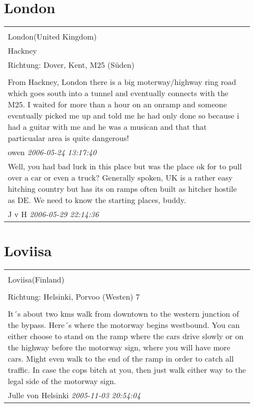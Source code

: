 \documentclass[a4paper,12pt]{article}
\begin{document}
\section{London}
\begin{tabular}{|p{13cm}|}
\hline\\
London(United Kingdom)\\
Hackney\\
Richtung: Dover, Kent, M25 (Süden) \\
\hline\\
From Hackney, London there is a big moterway/highway ring road which goes south into a tunnel and eventually connects with the M25. I waited for more than a hour on an onramp and someone eventually picked me up and told me he had only done so because i had a guitar with me and he was a musican and that that particualar area is quite dangerous! \\
owen \textit{ 2006-05-24 13:17:40 }\\\hline Well, you had bad luck in this place but was the place ok for to pull over a car or even a truck? Generally spoken, UK is a rather easy hitching country but has its on ramps often built as hitcher hostile as DE. We need to know the starting places, buddy. \\
J v H \textit{ 2006-05-29 22:14:36 }\\\hline
\end{tabular}


\section{Loviisa}
\begin{tabular}{|p{13cm}|}
\hline\\
Loviisa(Finland)\\
\\
Richtung: Helsinki, Porvoo (Westen) 7 \\
\hline\\
It´s about two kms walk from downtown to the western junction of the bypass. Here´s where the motorway begins westbound. You can either choose to stand on the ramp where the cars drive slowly or on the highway before the motorway sign, where you will have more cars. Might even walk to the end of the ramp in order to catch all traffic. In case the cops bitch at you, then just walk either way to the legal side of the motorway sign. \\
Julle von Helsinki \textit{ 2005-11-03 20:54:04 }\\\hline
\end{tabular}
\end{document}
